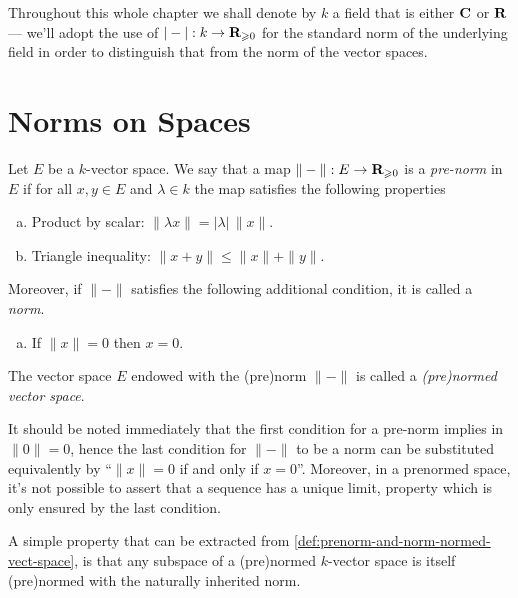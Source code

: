 \begin{remark}
    \label{rem:k-is-C-or-R}
    Throughout this whole chapter we shall denote by \(k\) a field that is either
    \(\mathbf{C}\) or \(\mathbf{R}\) --- we'll adopt the use of \(|-|: k \to \mathbf{R}_{\geqslant 0}\) for the
    standard norm of the underlying field in order to distinguish that from the norm
    of the vector spaces.
\end{remark}

\section{Norms on Spaces}

\begin{definition}
    \label{def:prenorm-and-norm-normed-vect-space}
    Let \(E\) be a \(k\)-vector space. We say that a map \(\|-\|: E \to
    \mathbf{R}_{\geqslant 0}\) is a \emph{pre-norm} in \(E\) if for all \(x, y \in E\) and
    \(\lambda \in k\) the map satisfies the following properties
    \begin{enumerate}[(a)]\setlength\itemsep{0em}
        \item Product by scalar: \(\|\lambda x\| = |\lambda|\, \|x\|\).
        \item Triangle inequality: \(\| x + y \| \leq \| x \| + \| y \|\).
    \end{enumerate}
    Moreover, if \(\| - \|\) satisfies the following additional condition, it is
    called a \emph{norm}.
    \begin{enumerate}[(a)]\setlength\itemsep{0em}\setcounter{enumi}{2}
        \item If \(\| x \| = 0\) then \(x = 0\).
    \end{enumerate}
    The vector space \(E\) endowed with the (pre)norm \(\| - \|\) is called a
    \emph{(pre)normed vector space}.
\end{definition}

It should be noted immediately that the first condition for a pre-norm implies in
\(\| 0 \| = 0\), hence the last condition for \(\| - \|\) to be a norm can be
substituted equivalently by ``\(\| x \| = 0\) if and only if \(x =
0\)''. Moreover, in a prenormed space, it's not possible to assert that a
sequence has a unique limit, property which is only ensured by the last
condition.

A simple property that can be extracted from
\cref{def:prenorm-and-norm-normed-vect-space}, is that any subspace of a
(pre)normed \(k\)-vector space is itself (pre)normed with the naturally
inherited norm.

